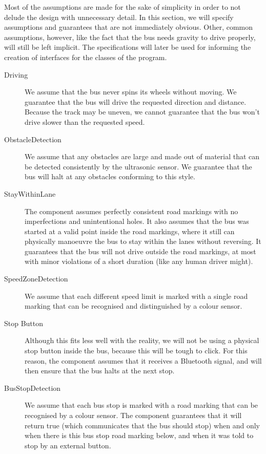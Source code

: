 Most of the assumptions are made for the sake of simplicity in order to not delude the design with unnecessary detail. In this section, we will specify assumptions and guarantees that are not immediately obvious. Other, common assumptions, however, like the fact that the bus needs gravity to drive properly, will still be left implicit. The specifications will later be used for informing the creation of interfaces for the classes of the program. 

\begin{description}
    \item[Driving]
    We assume that the bus never spins its wheels without moving. We guarantee that the bus will drive the requested direction and distance. Because the track may be uneven, we cannot guarantee that the bus won't drive slower than the requested speed. 
    
    \item[ObstacleDetection]
    We assume that any obstacles are large and made out of material that can be detected consistently by the ultrasonic sensor. We guarantee that the bus will halt at any obstacles conforming to this style. 
    
    \item[StayWithinLane]
    The component assumes perfectly consistent road markings with no imperfections and unintentional holes. It also assumes that the bus was started at a valid point inside the road markings, where it still can physically manoeuvre the bus to stay within the lanes without reversing. It guarantees that the bus will not drive outside the road markings, at most with minor violations of a short duration (like any human driver might). 
    
    \item[SpeedZoneDetection]
    We assume that each different speed limit is marked with a single road marking that can be recognised and distinguished by a colour sensor. 
    

    \item[Stop Button]
    Although this fits less well with the reality, we will not be using a physical stop button inside the bus, because this will be tough to click. For this reason, the component assumes that it receives a Bluetooth signal, and will then ensure that the bus halts at the next stop.  
    
    \item[BusStopDetection]
    We assume that each bus stop is marked with a road marking that can be recognised by a colour sensor. The component guarantees that it will return true (which communicates that the bus should stop) when and only when there is this bus stop road marking below, and when it was told to stop by an external button.  
    
    
\end{description}